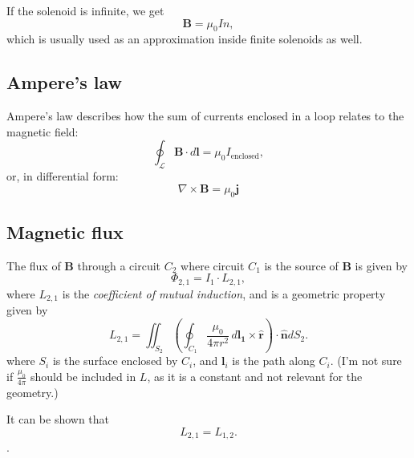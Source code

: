 \documentclass[a4paper, 12pt]{article}
\renewcommand{\vec}[1]{\mathbf{#1}}
\renewcommand{\j}{\ensuremath{\vec{j}}}
\newcommand{\B}{\ensuremath{\vec{B}}}
\let\tmp\hat
\renewcommand{\hat}[1]{\vec{\tmp{#1}}}
\begin{document}
            If the solenoid is infinite, we get
            \begin{equation}
                \B = \mu_0 In,
            \end{equation}
            which is usually used as an approximation inside finite solenoids as well.
    
    \subsection{Ampere's law}
        Ampere's law describes how the sum of currents enclosed in a loop relates to the magnetic field: 
        \begin{equation}
            \oint_\mathcal{L}\B\cdot d\vec{l} = \mu_0 I_{\text{enclosed}},
        \end{equation}
        or, in differential form: 
        \begin{equation}
            \nabla\times\B = \mu_0\j
        \end{equation}
    
    \subsection{Magnetic flux} \label{Magnetic flux}
        The flux of \B{} through a circuit $C_2$ where circuit $C_1$ is the source of \B{} is given by
        \begin{equation}
            \Phi_{2,1} = I_1 \cdot L_{2,1},
        \end{equation}
        where $L_{2,1}$ is the \textit{coefficient of mutual induction}, and is a geometric property given by
        \begin{equation}
            L_{2,1} = \iint_{S_2} \left(\oint_{C_1}\frac{\mu_0}{4\pi r^2}\,d\vec{l_1}\times \hat{r} \right)\cdot \hat{n} dS_2.
        \end{equation}
        where $S_i$ is the surface enclosed by $C_i$, and $\vec{l}_i$ is the path along $C_i$.
        (I'm not sure if $\frac{\mu_0}{4\pi}$ should be included in $L$, as it is a constant and not relevant for the geometry.)

        It can be shown that 
        \begin{equation}
            L_{2,1} = L_{1,2}.
        \end{equation}.
    
\end{document}
